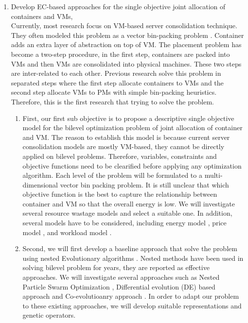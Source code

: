 \begin{enumerate}
	\item Develop EC-based approaches for the single objective joint allocation of containers and VMs, \\ 
	Currently, most research focus on VM-based server consolidation technique. They often modeled this problem as a vector bin-packing problem \cite{Zhang:2016cx}. Container adds an extra layer of abstraction on top of VM. The placement problem has become a two-step procedure, in the first step, containers are packed into VMs and then VMs are consolidated into physical machines. These two steps are inter-related to each other. Previous research \cite{Piraghaj:2015uf} solve this problem in separated steps where the first step allocate containers to VMs and the second step allocate VMs to PMs with simple bin-packing heuristics. Therefore, this is the first research that trying to solve the problem.
	\begin{enumerate}
		\item First, our first sub objective is to propose a descriptive single objective model for the bilevel optimization problem of joint allocation of container and VM. The reason to establish this model is because current server consolidation models are mostly VM-based, they cannot be directly applied on bilevel problems. Therefore, variables, constraints and objective functions need to be clearified before applying any optimization algorithm.
		Each level of the problem will be formulated to a multi-dimensional vector bin packing problem. It is still unclear that which objective function is the best to capture the relationship between container and VM so that the overall energy is low. We will investigate several resource wastage models \cite{Ferdaus:2014ep, Xu:2010df, Gao:2013gg} and select a suitable one. In addition, several models have to be considered, including energy model \cite{Dayarathna:2016ua}, price model \cite{AlRoomi:2013te}, and workload model \cite{Magalhaes:2015ep}.
		\item Second, we will first develop a baseline approach that solve the problem using nested Evolutionary algorithms \cite{Sinha:2017et}. Nested methods have been used in solving bilevel problem for years, they are reported as effective approaches. We will investigate several approaches such as Nested Particle Swarm Optimization \cite{Li:2006br}, Differential evolution (DE) based approach \cite{Angelo:2013ee, Zhu:2006in} and Co-evolutioanry approach \cite{Legillon:2012dd}. In order to adapt our problem to these existing approaches, we will develop suitable representations and genetic operators.


\end{enumerate}
\end{enumerate}
